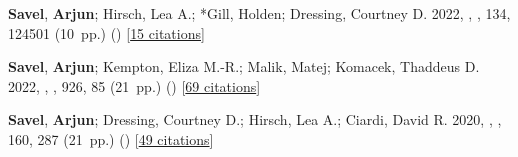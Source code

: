 \item[{\color{numcolor}\scriptsize3}] \textbf{Savel}, \textbf{Arjun}; Hirsch, Lea A.; *Gill, Holden; Dressing, Courtney D. \etal{} 2022, , \pasp, {134}, 124501 (10~pp.) () [\href{https://ui.adsabs.harvard.edu/abs/2022PASP..134l4501S}{15 citations}]

\item[{\color{numcolor}\scriptsize2}] \textbf{Savel}, \textbf{Arjun}; Kempton, Eliza M.-R.; Malik, Matej; Komacek, Thaddeus D. \etal{} 2022, , \apj, {926}, 85 (21~pp.) () [\href{https://ui.adsabs.harvard.edu/abs/2022ApJ...926...85S}{69 citations}]

\item[{\color{numcolor}\scriptsize1}] \textbf{Savel}, \textbf{Arjun}; Dressing, Courtney D.; Hirsch, Lea A.; Ciardi, David R. \etal{} 2020, , \aj, {160}, 287 (21~pp.) () [\href{https://ui.adsabs.harvard.edu/abs/2020AJ....160..287S}{49 citations}]